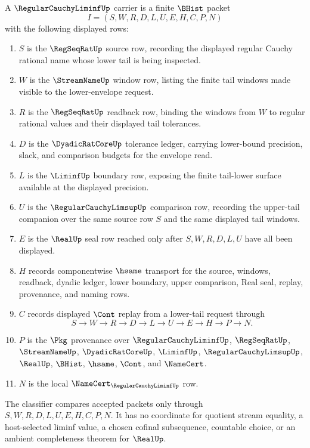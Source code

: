 \begin{definition}
\label{def:regular-cauchy-liminf-carrier}
A $\RegularCauchyLiminfUp$ carrier is a finite $\BHist$ packet
$$
I=(S,W,R,D,L,U,E,H,C,P,N)
$$
with the following displayed rows:
\begin{enumerate}
\item $S$ is the $\RegSeqRatUp$ source row, recording the displayed regular Cauchy rational name whose lower tail is being inspected.
\item $W$ is the $\StreamNameUp$ window row, listing the finite tail windows made visible to the lower-envelope request.
\item $R$ is the $\RegSeqRatUp$ readback row, binding the windows from $W$ to regular rational values and their displayed tail tolerances.
\item $D$ is the $\DyadicRatCoreUp$ tolerance ledger, carrying lower-bound precision, slack, and comparison budgets for the envelope read.
\item $L$ is the $\LiminfUp$ boundary row, exposing the finite tail-lower surface available at the displayed precision.
\item $U$ is the $\RegularCauchyLimsupUp$ comparison row, recording the upper-tail companion over the same source row $S$ and the same displayed tail windows.
\item $E$ is the $\RealUp$ seal row reached only after $S,W,R,D,L,U$ have all been displayed.
\item $H$ records componentwise $\hsame$ transport for the source, windows, readback, dyadic ledger, lower boundary, upper comparison, Real seal, replay, provenance, and naming rows.
\item $C$ records displayed $\Cont$ replay from a lower-tail request through
$$
S \longrightarrow W \longrightarrow R \longrightarrow D \longrightarrow L \longrightarrow U \longrightarrow E \longrightarrow H \longrightarrow P \longrightarrow N .
$$
\item $P$ is the $\Pkg$ provenance over $\RegularCauchyLiminfUp$, $\RegSeqRatUp$, $\StreamNameUp$, $\DyadicRatCoreUp$, $\LiminfUp$, $\RegularCauchyLimsupUp$, $\RealUp$, $\BHist$, $\hsame$, $\Cont$, and $\NameCert$.
\item $N$ is the local $\NameCert_{\RegularCauchyLiminfUp}$ row.
\end{enumerate}
The classifier compares accepted packets only through $S,W,R,D,L,U,E,H,C,P,N$. It has no coordinate for quotient stream equality, a host-selected liminf value, a chosen cofinal subsequence, countable choice, or an ambient completeness theorem for $\RealUp$.
\end{definition}

